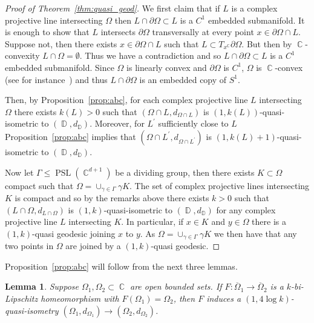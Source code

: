 \documentclass[12pt]{amsart}
\theoremstyle{plain}
\newtheorem{lemma}[proposition]{Lemma}
\theoremstyle{definition}
\theoremstyle{remark}
\begin{document}
\begin{proof}[Proof of Theorem~\ref{thm:quasi_geod}]
We first claim that if $L$ is a complex projective line intersecting $\Omega$ then $L \cap \partial\Omega \subset L$ is a $C^1$ embedded submanifold. It is enough to show that $L$ intersects $\partial \Omega$ transversally at every point $x \in \partial \Omega \cap L$. Suppose not, then there exists $x \in \partial \Omega \cap L$ such that $L \subset T_x^\operatorname{\mathbb{C}} \partial \Omega$. But then by $\operatorname{\mathbb{C}}$-convexity $L \cap \Omega = \emptyset$. Thus we have a contradiction and so $L \cap \partial\Omega \subset L$ is a $C^1$ embedded submanifold. Since $\Omega$ is linearly convex and $\partial \Omega$ is $C^1$, $\Omega$ is $\operatorname{\mathbb{C}}$-convex (see for instance~\cite[Corollary 2.5.6]{APS2004}) and thus $L \cap \partial\Omega$ is an embedded copy of $S^1$. 

Then, by Proposition~\ref{prop:abc}, for each complex projective line $L$ intersecting $\Omega$ there exists $k(L)>0$ such that $(\Omega \cap L, d_{\Omega \cap L})$ is $(1,k(L))$-quasi-isometric to $(\operatorname{\mathbb{D}},d_\operatorname{\mathbb{D}})$. Moreover, for $L^\prime$ sufficiently close to $L$ Proposition~\ref{prop:abc} implies that $(\Omega \cap L^\prime, d_{\Omega \cap L^\prime})$ is $(1,k(L)+1)$-quasi-isometric to $(\operatorname{\mathbb{D}},d_\operatorname{\mathbb{D}})$. 

Now let $\Gamma \leq \operatorname{PSL}(\operatorname{\mathbb{C}}^{d+1})$ be a dividing group, then there exists $K \subset \Omega$ compact such that $\Omega  = \cup_{\gamma \in \Gamma} \gamma K$. The set of complex projective lines intersecting $K$ is compact and so by the remarks above there exists $k>0$ such that $(L \cap \Omega, d_{L \cap \Omega})$ is $(1,k)$-quasi-isometric to $(\operatorname{\mathbb{D}},d_\operatorname{\mathbb{D}})$ for any complex projective line $L$ intersecting $K$. In particular, if $x \in K$ and $y \in \Omega$ there is a $(1,k)$-quasi geodesic joining $x$ to $y$. As $\Omega  = \cup_{\gamma \in \Gamma} \gamma K$ we then have that any two points in $\Omega$ are joined by a $(1,k)$-quasi geodesic.
\end{proof}

Proposition~\ref{prop:abc} will follow from the next three lemmas.

\begin{lemma}
\label{lem:abc1}
Suppose $\Omega_1, \Omega_2 \subset \operatorname{\mathbb{C}}$ are open bounded sets. If $F: \overline{\Omega}_1 \rightarrow \overline{\Omega}_2$ is a $k$-bi-Lipschitz homeomorphism with $F(\Omega_1)=\Omega_2$, then $F$ induces a $(1,4\log k)$-quasi-isometry $(\Omega_1, d_{\Omega_1}) \rightarrow (\Omega_2, d_{\Omega_2})$. 
\end{lemma}
\end{document}
